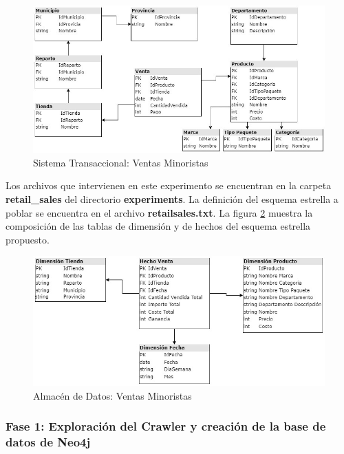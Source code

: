 \begin{figure}[ht]
    \centering
    \includegraphics[scale=0.7]{../document/Graphics/retailSales-Transactional.jpg}
    \caption{Sistema Transaccional: Ventas Minoristas}
    \label{fig:retail-transactional}
  \end{figure}

Los archivos que intervienen en este experimento se encuentran en la carpeta \textbf{retail\_sales} del 
directorio \textbf{experiments}. La definición del esquema estrella a poblar se encuentra en el archivo 
\textbf{retailsales.txt}. La figura \ref{fig:retail-Warehouse} muestra la composición de las 
tablas de dimensión y de hechos del esquema estrella propuesto.

\begin{figure}
    \centering
    \includegraphics[scale=0.5]{../document/Graphics/retailSales-Data Warehouse.jpg}
    \caption{Almacén de Datos: Ventas Minoristas}
    \label{fig:retail-Warehouse}
\end{figure}

\subsubsection{Fase 1: Exploraci\'on del Crawler y creaci\'on de la base de datos de Neo4j}

